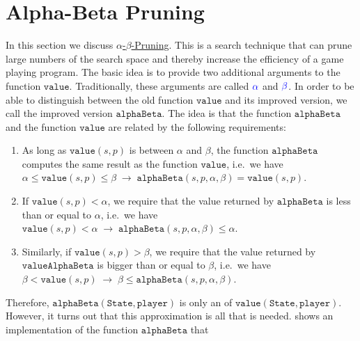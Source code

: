 \section{Alpha-Beta Pruning}
In this section we discuss \href{https://en.wikipedia.org/wiki/Alpha-beta_pruning}{$\alpha$-$\beta$-Pruning}.
This is a search technique that can prune large numbers of the search space and thereby increase the efficiency
of a game playing program.  The basic idea is to provide two additional arguments to the function
$\texttt{value}$.  Traditionally, these arguments are called ${\color{blue}\alpha}$ and ${\color{blue}\beta}$.  In order to be able to
distinguish between the old function $\texttt{value}$ and its improved version, we call the improved version 
$\texttt{alphaBeta}$.  The idea is that the function $\texttt{alphaBeta}$ and the function $\texttt{value}$ are
related by the following requirements: 
\begin{enumerate}
\item As long as $\texttt{value}(s, p)$ is between $\alpha$ and $\beta$, the function
      $\texttt{alphaBeta}$ computes the same result as the function $\texttt{value}$,
      i.e.~we have
      \\[0.2cm]
      \hspace*{0.3cm}
      $\alpha \leq \texttt{value}(s, p) \leq \beta \;\rightarrow\;
         \texttt{alphaBeta}(s, p, \alpha, \beta) = \texttt{value}(s,p)
      $.
\item If $\texttt{value}(s, p) < \alpha$, we require that the value returned by
      $\texttt{alphaBeta}$ is less than or equal to $\alpha$, i.e.~we have 
      \\[0.2cm]
      \hspace*{0.3cm}
      $\texttt{value}(s, p) < \alpha \;\rightarrow\; \texttt{alphaBeta}(s, p, \alpha, \beta) \leq \alpha$.
\item Similarly, if $\texttt{value}(s, p) > \beta$, we require that the value
      returned by $\texttt{valueAlphaBeta}$ is bigger than or equal to $\beta$, i.e.~we have 
      \\[0.2cm]
      \hspace*{0.3cm}
      $\beta < \texttt{value}(s, p) \;\rightarrow\; \beta \leq \texttt{alphaBeta}(s, p, \alpha, \beta)$.
\end{enumerate}
Therefore, $\texttt{alphaBeta}(\texttt{State}, \texttt{player})$  is only an  of
$\texttt{value}(\texttt{State}, \texttt{player})$.  However, it turns out that this approximation is all that
is needed.   shows an implementation of the function $\texttt{alphaBeta}$ that
